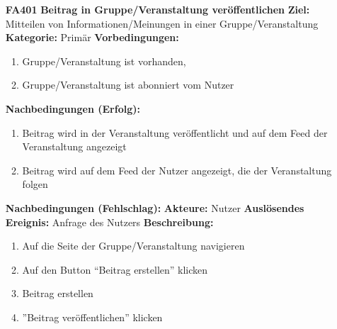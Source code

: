 \documentclass[parskip=full]{scrartcl}
\begin{document}
\begin{itemize}[nosep]
			\newpage
			\item[\textbf{FA401}]\textbf{Beitrag in Gruppe/Veranstaltung veröffentlichen}
			\newline \textbf{Ziel:} Mitteilen von Informationen/Meinungen in einer Gruppe/Veranstaltung
			\newline \textbf{Kategorie:} Primär
			\newline \textbf{Vorbedingungen:}
			\begin{enumerate}[nosep]
				\item Gruppe/Veranstaltung ist vorhanden,
				\item Gruppe/Veranstaltung ist abonniert vom Nutzer
			\end{enumerate}
			\textbf{Nachbedingungen (Erfolg):}
			\begin{enumerate}[nosep]
				\item Beitrag wird in der Veranstaltung veröffentlicht und auf dem \gls{Feed} der Veranstaltung angezeigt
				\item Beitrag wird auf dem \gls{Feed} der Nutzer angezeigt, die der Veranstaltung folgen
			\end{enumerate}
			\textbf{Nachbedingungen (Fehlschlag):}
			\newline \textbf{Akteure:} Nutzer
			\newline \textbf{Auslösendes Ereignis:} Anfrage des Nutzers
			\newline \textbf{Beschreibung:}
			\begin{enumerate}[nosep]
				\item Auf die Seite der Gruppe/Veranstaltung navigieren
				\item Auf den \gls{Button} “Beitrag erstellen” klicken
				\item Beitrag erstellen
				\item ”Beitrag veröffentlichen” klicken\\
			\end{enumerate}
			

\end{itemize}
\end{document}
